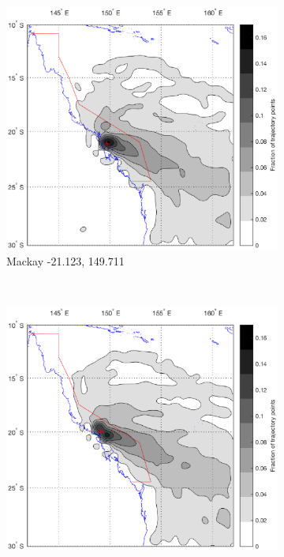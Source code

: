 \begin{figure}[!hbt]
    \centering
    \begin{subfigure}[b]{0.45\textwidth}
	    \includegraphics[width=\textwidth]{Fig/Research/BT_Ship/Map_101.eps}
	    \caption{Mackay -21.123, 149.711}
	    \label{subfig:whit}
    \end{subfigure}
    ~
    \begin{subfigure}[b]{0.45\textwidth}
    	\includegraphics[width=\textwidth]{Fig/Research/BT_Ship/Map_102.eps}

\end{subfigure}
\end{figure}
